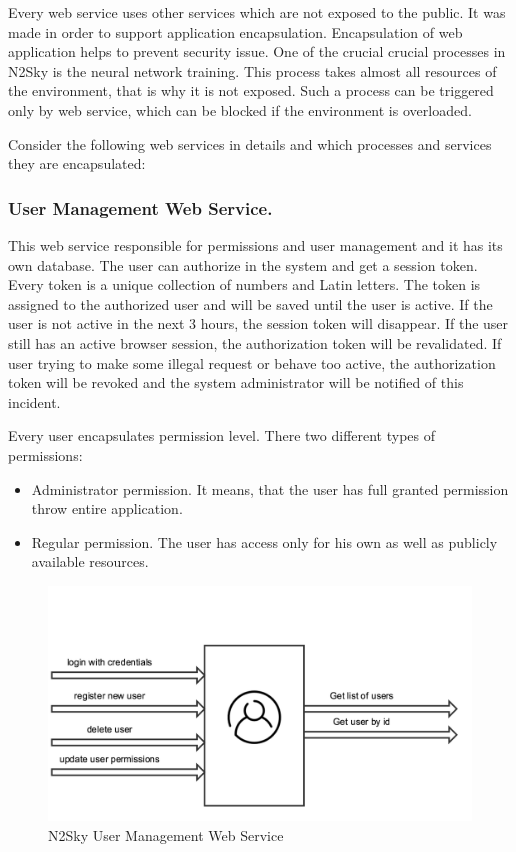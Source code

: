 Every web service uses other services which are not exposed to the public. It was made in order to support application encapsulation. Encapsulation of web application helps to prevent security issue. One of the crucial crucial processes in N2Sky is the neural network training. This process takes almost all resources of the environment, that is why it is not exposed. Such a process can be triggered only by web service, which can be blocked if the environment is overloaded.

Consider the following web services in details and which processes and services they are encapsulated:  


\subsubsection{User Management Web Service.}\label{User Management Web Service}   This web service responsible for permissions and user management and it has its own database. The user can authorize in the system and get a session token. Every token is a unique collection of numbers and Latin letters. The token is assigned to the authorized user and will be saved until the user is active. If the user is not active in the next 3 hours, the session token will disappear. If the user still has an active browser session, the authorization token will be revalidated. If user trying to make some illegal request or behave too active, the authorization token will be revoked and the system administrator will be notified of this incident. 

Every user encapsulates permission level. There two different types of permissions:
\begin{itemize}
\item Administrator permission. It means, that the user has full granted permission throw entire application.
\item Regular permission. The user has access only for his own as well as publicly available resources.  
\end{itemize}

 \begin{figure}[H]
\begin{center}
  \includegraphics[width=\linewidth]{components/3/components/user_serivice.png}
  \caption{N2Sky User Management Web Service}
  \label{fig:user_serivice}
\end{center}
\end{figure}

